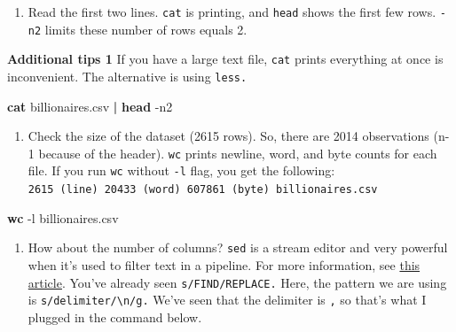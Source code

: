 \documentclass[
]{book}
\newenvironment{Shaded}{\begin{snugshade}}{\end{snugshade}}
\newcommand{\AttributeTok}[1]{\textcolor[rgb]{0.13,0.29,0.53}{#1}}
\newcommand{\FunctionTok}[1]{\textcolor[rgb]{0.13,0.29,0.53}{\textbf{#1}}}
\newcommand{\KeywordTok}[1]{\textcolor[rgb]{0.13,0.29,0.53}{\textbf{#1}}}
\newcommand{\NormalTok}[1]{#1}
\providecommand{\tightlist}{%
  \setlength{\itemsep}{0pt}\setlength{\parskip}{0pt}}
\begin{document}
\begin{enumerate}
\def\labelenumi{\arabic{enumi}.}
\setcounter{enumi}{1}
\tightlist
\item
  Read the first two lines. \texttt{cat} is printing, and \texttt{head} shows the first few rows. \texttt{-n2} limits these number of rows equals 2.
\end{enumerate}

\textbf{Additional tips 1}
If you have a large text file, \texttt{cat} prints everything at once is inconvenient. The alternative is using \texttt{less.}

\begin{Shaded}
\begin{Highlighting}[]
\FunctionTok{cat}\NormalTok{ billionaires.csv }\KeywordTok{|} \FunctionTok{head} \AttributeTok{{-}n2}
\end{Highlighting}
\end{Shaded}

\begin{enumerate}
\def\labelenumi{\arabic{enumi}.}
\setcounter{enumi}{2}
\tightlist
\item
  Check the size of the dataset (2615 rows). So, there are 2014 observations (n-1 because of the header). \texttt{wc} prints newline, word, and byte counts for each file. If you run \texttt{wc} without \texttt{-l} flag, you get the following: \texttt{2615\ (line)\ 20433\ (word)\ 607861\ (byte)\ billionaires.csv}
\end{enumerate}

\begin{Shaded}
\begin{Highlighting}[]
\FunctionTok{wc} \AttributeTok{{-}l}\NormalTok{ billionaires.csv}
\end{Highlighting}
\end{Shaded}

\begin{enumerate}
\def\labelenumi{\arabic{enumi}.}
\setcounter{enumi}{3}
\tightlist
\item
  How about the number of columns? \texttt{sed} is a stream editor and very powerful when it's used to filter text in a pipeline. For more information, see \href{https://www.gnu.org/software/sed/manual/sed.html}{this article}. You've already seen \texttt{s/FIND/REPLACE.} Here, the pattern we are using is \texttt{s/delimiter/\textbackslash{}n/g.} We've seen that the delimiter is \texttt{,} so that's what I plugged in the command below.
\end{enumerate}
\end{document}
